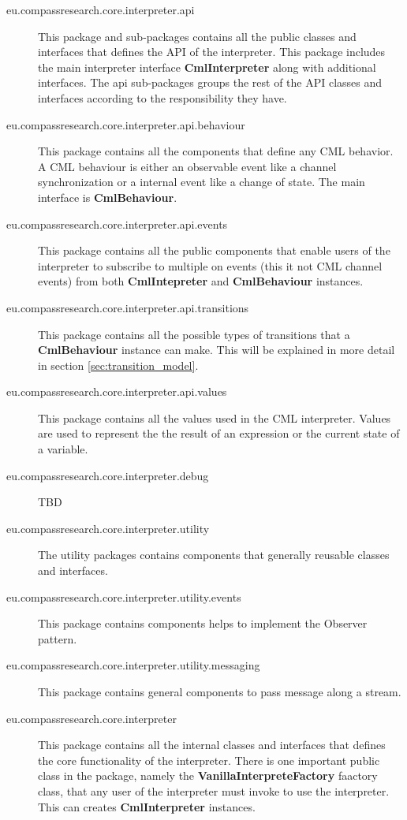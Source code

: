 \documentclass[a4paper, 10pt]{include/compassreport}   %
\begin{document}
\begin{description}
\item[eu.compassresearch.core.interpreter.api] This package and
  sub-packages contains all the public classes and interfaces that
  defines the API of the interpreter. This package includes the main
  interpreter interface \textbf{CmlInterpreter} along with additional
  interfaces.
  The api sub-packages groups the rest of the API classes and
  interfaces according to the responsibility they have.

\item[eu.compassresearch.core.interpreter.api.behaviour] This package
  contains all the components that define any CML behavior. A CML
  behaviour is either an observable event like a channel synchronization
  or a internal event like a change of state. The main interface is
  \textbf{CmlBehaviour}.

\item[eu.compassresearch.core.interpreter.api.events] This package
  contains all the public components that enable users of the
  interpreter to subscribe to multiple on events (this it not CML
  channel events) from both \textbf{CmlIntepreter} and
  \textbf{CmlBehaviour} instances.

\item[eu.compassresearch.core.interpreter.api.transitions] This
  package contains all the possible types of transitions that a
  \textbf{CmlBehaviour} instance can make. This will be explained in
  more detail in section \ref{sec:transition_model}.

\item[eu.compassresearch.core.interpreter.api.values] This package
  contains all the values used in the CML interpreter. Values are used
  to represent the the result of an expression or the current state of a
  variable.

\item[eu.compassresearch.core.interpreter.debug] TBD

\item[eu.compassresearch.core.interpreter.utility] The utility
  packages contains components that generally reusable classes and
  interfaces. 

\item[eu.compassresearch.core.interpreter.utility.events] This package
  contains components helps to implement the Observer pattern. 

\item[eu.compassresearch.core.interpreter.utility.messaging] This
  package contains general components to pass message along a stream.

\item[eu.compassresearch.core.interpreter] This package contains all
  the internal classes and interfaces that defines the core
  functionality of the interpreter. There is one important public class
  in the package, namely the \textbf{VanillaInterpreteFactory} faactory
  class, that any user of the interpreter must invoke to use the
  interpreter. This can creates \textbf{CmlInterpreter} instances.

\end{description}
\end{document}
